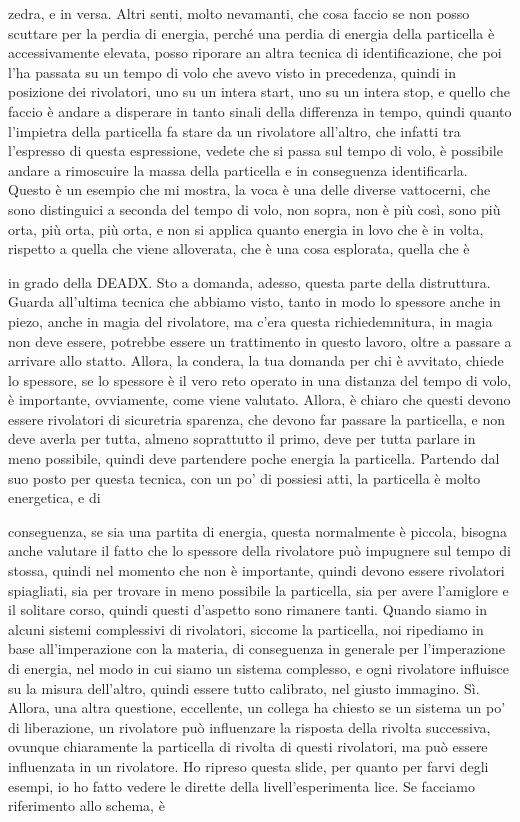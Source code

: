 zedra, e in versa. Altri senti, molto nevamanti, che cosa faccio se non posso scuttare per la perdia di energia, perché una perdia di energia della particella è accessivamente elevata, posso riporare an altra tecnica di identificazione, che poi l'ha passata su un tempo di volo che avevo visto in precedenza, quindi in posizione dei rivolatori, uno su un intera start, uno su un intera stop, e quello che faccio è andare a disperare in tanto sinali della differenza in tempo, quindi quanto l'impietra della particella fa stare da un rivolatore all'altro, che infatti tra l'espresso di questa espressione, vedete che si passa sul tempo di volo, è possibile andare a rimoscuire la massa della particella e in conseguenza identificarla. Questo è un esempio che mi mostra, la voca è una delle diverse vattocerni, che sono distinguici a seconda del tempo di volo, non sopra, non è più così, sono più orta, più orta, più orta, e non si applica quanto energia in lovo che è in volta, rispetto a quella che viene alloverata, che è una cosa esplorata, quella che è 

in grado della DEADX. Sto a domanda, adesso, questa parte della distruttura. Guarda all'ultima tecnica che abbiamo visto, tanto in modo lo spessore anche in piezo, anche in magia del rivolatore, ma c'era questa richiedemnitura, in magia non deve essere, potrebbe essere un trattimento in questo lavoro, oltre a passare a arrivare allo statto. Allora, la condera, la tua domanda per chi è avvitato, chiede lo spessore, se lo spessore è il vero reto operato in una distanza del tempo di volo, è importante, ovviamente, come viene valutato. Allora, è chiaro che questi devono essere rivolatori di sicuretria sparenza, che devono far passare la particella, e non deve averla per tutta, almeno soprattutto il primo, deve per tutta parlare in meno possibile, quindi deve partendere poche energia la particella. Partendo dal suo posto per questa tecnica, con un po' di possiesi atti, la particella è molto energetica, e di 

conseguenza, se sia una partita di energia, questa normalmente è piccola, bisogna anche valutare il fatto che lo spessore della rivolatore può impugnere sul tempo di stossa, quindi nel momento che non è importante, quindi devono essere rivolatori spiagliati, sia per trovare in meno possibile la particella, sia per avere l'amiglore e il solitare corso, quindi questi d'aspetto sono rimanere tanti. Quando siamo in alcuni sistemi complessivi di rivolatori, siccome la particella, noi ripediamo in base all'imperazione con la materia, di conseguenza in generale per l'imperazione di energia, nel modo in cui siamo un sistema complesso, e ogni rivolatore influisce su la misura dell'altro, quindi essere tutto calibrato, nel giusto immagino. Sì. Allora, una altra questione, eccellente, un collega ha chiesto se un sistema un po' di liberazione, un rivolatore può influenzare la risposta della rivolta successiva, ovunque chiaramente la particella di rivolta di questi rivolatori, ma può essere influenzata in un rivolatore. Ho ripreso questa slide, per quanto per farvi degli esempi, io ho fatto vedere le dirette della livell'esperimenta lice. Se facciamo riferimento allo schema, è 

